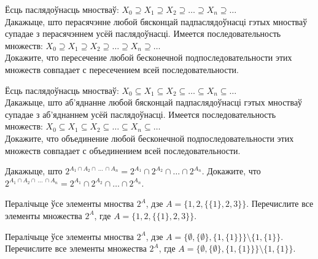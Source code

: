 \begin{problemList}
{\begin{belarusianEnumerate}
	\end{belarusianEnumerate}
	}
	
	\bigskip
	
	\item
	\begin{belarusianEnumerate}
		
	\problemItemSimple
	{Ёсць паслядоўнасць мностваў: $X_0 \supseteq X_1 \supseteq X_2 \supseteq \ldots \supseteq X_n \supseteq \ldots$ \\ Дакажыце, што перасячэнне любой бясконцай падпаслядоўнасці гэтых мностваў супадае з перасячэннем усёй паслядоўнасці.}
	{Имеется последовательность множеств: $X_0 \supseteq X_1 \supseteq X_2 \supseteq \ldots \supseteq X_n \supseteq \ldots$ \\ Докажите, что пересечение любой бесконечной подпоследовательности этих множеств совпадает с пересечением всей последовательности.}
	
	\problemItemSimple
	{Ёсць паслядоўнасць мностваў: $X_0 \subseteq X_1 \subseteq X_2 \subseteq \ldots \subseteq X_n \subseteq \ldots$ \\ Дакажыце, што аб'яднанне любой бясконцай падпаслядоўнасці гэтых мностваў супадае з аб'яднаннем усёй паслядоўнасці.}
	{Имеется последовательность множеств: $X_0 \subseteq X_1 \subseteq X_2 \subseteq \ldots \subseteq X_n \subseteq \ldots$ \\ Докажите, что объединение любой бесконечной подпоследовательности этих множеств совпадает с объединением всей последовательности.}
		
	\end{belarusianEnumerate}
	
	\bigskip
	
	\item
	\begin{belarusianEnumerate}
		
	\problemItemSimple
	{Дакажыце, што $2^{A_1 \cap A_2 \cap\, \ldots\, \cap A_n} = 2^{A_1} \cap 2^{A_2} \cap \ldots \cap 2^{A_n}$.}
	{Докажите, что $2^{A_1 \cap A_2 \cap\, \ldots\, \cap A_n} = 2^{A_1} \cap 2^{A_2} \cap \ldots \cap 2^{A_n}$.}
	
	\problemItemSimple
	{Пералічыце ўсе элементы мноства $2^A$, дзе $A = \{1, 2, \{\{1\}, 2, 3\}\}$.}
	{Перечислите все элементы множества $2^A$, где $A = \{1, 2, \{\{1\}, 2, 3\}\}$.}
	
	\problemItemSimple
	{Пералічыце ўсе элементы мноства $2^A$, дзе 
	$A = \{\emptyset, \{\emptyset\}, \{1, \{1\}\}\} \setminus \{1, \{1\}\}$.}
	{Перечислите все элементы множества $2^A$, где
	$A = \{\emptyset, \{\emptyset\}, \{1, \{1\}\}\} \setminus \{1, \{1\}\}$.}
	
	\end{belarusianEnumerate}
	
	\smallskip
	
		
	\end{problemList}

